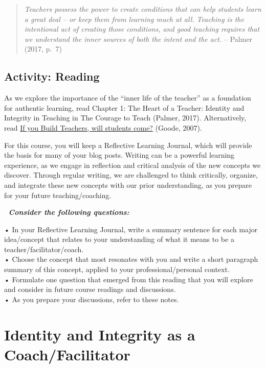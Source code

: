 \documentclass[
]{book}
\begin{document}
\begin{quote}
\emph{Teachers possess the power to create conditions that can help students learn a great deal -- or keep them from learning much at all. Teaching is the intentional act of creating those conditions, and good teaching requires that we understand the inner sources of both the intent and the act.} -- Palmer (2017, p.~7)
\end{quote}

\hypertarget{activity-reading}{%
\subsection{Activity: Reading}\label{activity-reading}}

\begin{reflect}
As we explore the importance of the ``inner life of the teacher'' as a
foundation for authentic learning, read Chapter 1: The Heart of a
Teacher: Identity and Integrity in Teaching in The Courage to Teach
(Palmer, 2017). Alternatively, read
\href{https://journals-sagepub-com.twu.idm.oclc.org/doi/pdf/10.2190/2102-5G77-QL77-5506}{If
you Build Teachers, will students come?} (Goode, 2007).

For this course, you will keep a Reflective Learning Journal, which will
provide the basis for many of your blog posts. Writing can be a powerful
learning experience, as we engage in reflection and critical analysis of
the new concepts we discover. Through regular writing, we are challenged
to think critically, organize, and integrate these new concepts with our
prior understanding, as you prepare for your future teaching/coaching.

💭 \textbf{\emph{Consider the following questions:}}

• In your Reflective Learning Journal, write a summary sentence for each
major idea/concept that relates to your understanding of what it means
to be a teacher/facilitator/coach.\\
• Choose the concept that most resonates with you and write a short
paragraph summary of this concept, applied to your professional/personal
context.\\
• Formulate one question that emerged from this reading that you will
explore and consider in future course readings and discussions.\\
• As you prepare your discussions, refer to these notes.
\end{reflect}

\hypertarget{identity-and-integrity-as-a-coachfacilitator}{%
\section{Identity and Integrity as a Coach/Facilitator}\label{identity-and-integrity-as-a-coachfacilitator}}
\end{document}
